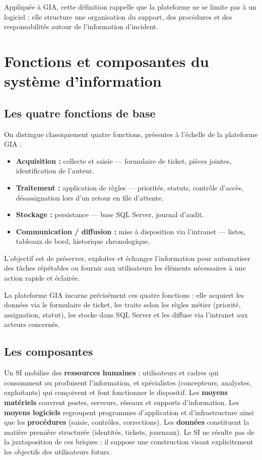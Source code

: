 Appliquée à GIA, cette définition rappelle que la plateforme ne se limite pas à un logiciel : elle
structure une organisation du support, des procédures et des responsabilités autour de
l'information d'incident.

\section{Fonctions et composantes du système d'information}

\subsection{Les quatre fonctions de base}
On distingue classiquement quatre fonctions, présentes à l'échelle de la plateforme GIA :
\begin{itemize}
    \item \textbf{Acquisition :} collecte et saisie — formulaire de ticket, pièces jointes,
    identification de l'auteur.
    \item \textbf{Traitement :} application de règles — priorités, statuts, contrôle d'accès,
    désassignation lors d'un retour en file d'attente.
    \item \textbf{Stockage :} persistance — base SQL Server, journal d'audit.
    \item \textbf{Communication / diffusion :} mise à disposition via l'intranet — listes,
    tableaux de bord, historique chronologique.
\end{itemize}
L'objectif est de préserver, exploiter et échanger l'information pour automatiser des tâches
répétables ou fournir aux utilisateurs les éléments nécessaires à une action rapide et éclairée.

La plateforme GIA incarne précisément ces quatre fonctions : elle acquiert les données via le
formulaire de ticket, les traite selon les règles métier (priorité, assignation, statut), les
stocke dans SQL Server et les diffuse via l'intranet aux acteurs concernés.

\subsection{Les composantes}
Un SI mobilise des \textbf{ressources humaines} : utilisateurs et cadres qui consomment ou
produisent l'information, et spécialistes (concepteurs, analystes, exploitants) qui conçoivent
et font fonctionner le dispositif. Les \textbf{moyens matériels} couvrent postes, serveurs,
réseaux et supports d'information. Les \textbf{moyens logiciels} regroupent programmes
d'application et d'infrastructure ainsi que les \textbf{procédures} (saisie, contrôles,
corrections). Les \textbf{données} constituent la matière première structurée (identités,
tickets, journaux). Le SI ne résulte pas de la juxtaposition de ces briques : il suppose une
construction visant explicitement les objectifs des utilisateurs futurs.

